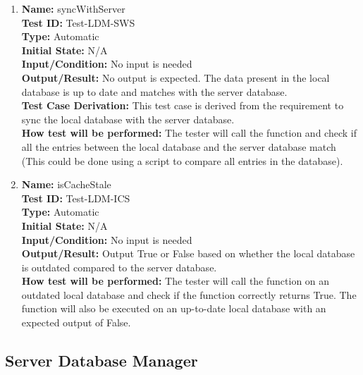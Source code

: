 \documentclass[12pt, titlepage]{article}
\begin{document}
\begin{enumerate}
  \item \textbf{Name:} syncWithServer \label{itm:Test-LDM-SWS} \\
        \textbf{Test ID:} Test-LDM-SWS \\
        \textbf{Type:} Automatic \\
        \textbf{Initial State:} N/A \\
        \textbf{Input/Condition:} No input is needed \\
        \textbf{Output/Result:} No output is expected. The data present in the local database is up to date and matches with the server database. \\
        \textbf{Test Case Derivation:} This test case is derived from the requirement to sync the local database with the server database. \\
        \textbf{How test will be performed:} The tester will call the function and check if all the entries between the local database and the server database match (This could be done using a script to compare all entries in the database). \\

  \item \textbf{Name:} isCacheStale \label{itm:Test-LDM-ICS} \\
        \textbf{Test ID:} Test-LDM-ICS \\
        \textbf{Type:} Automatic \\
        \textbf{Initial State:} N/A \\
        \textbf{Input/Condition:} No input is needed \\
        \textbf{Output/Result:} Output True or False based on whether the local database is outdated compared to the server database. \\
        \textbf{How test will be performed:} The tester will call the function on an outdated local database and check if the function correctly returns True. The function will also be executed on an up-to-date local database with an expected output of False. \\

\end{enumerate}

\subsection{Server Database Manager}
\end{document}
